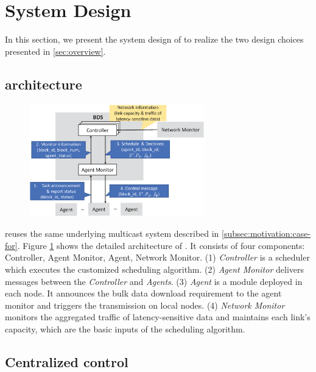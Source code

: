 \section{System Design}
\label{sec:system}

In this section, we present the system design of \name to realize the two design choices presented in \Section\ref{sec:overview}.

\subsection{\name architecture}
\label{subsec:system:architecture}

\begin{figure}[t]
  \centering
  \includegraphics[width=3in]{images/implementation_v2.eps}
  \label{fig:implementation}
\vspace{-0.4cm}
\end{figure}

\name reuses the same underlying multicast system described in \Section\ref{subsec:motivation:case-for}. Figure \ref{fig:implementation} shows the detailed architecture of \name. It consists of four components: Controller, Agent Monitor, Agent, Network Monitor. (1) \emph{Controller} is a scheduler which executes the customized scheduling algorithm. (2) \emph{Agent Monitor} delivers messages between the \emph{Controller} and \emph{Agents}. (3) \emph{Agent} is a module deployed in each node. It announces the bulk data download requirement to the agent monitor and triggers the transmission on local nodes. (4) \emph{Network Monitor} monitors the aggregated traffic of latency-sensitive data and maintains each link's capacity, which are the basic inputs of the scheduling algorithm.

\subsection{Centralized control}
\label{subsec:system:centralized}


